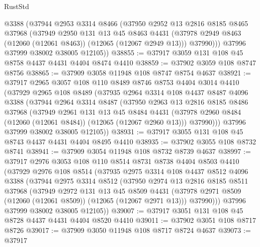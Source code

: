 \begin{lexlean}{RustStd}
\begin{coremodule}
        @3388
        (@37944
          @2953
          @3314
          @8466
          (@37950
            @2952
            @13
            @2816
            @8185
            @8465
            @37968
            (@37949
              @2950
              @131
              @13
              @45
              @8463
              @4431
              (@37978 @2949 @8463 (@12060 (@12061 @8463)) (@12065 (@12067 @2949 @13)))
              @37990)))
        @37996
        @37999
        @38002
        @38005
        @12105))
@38855 := @37917 @3059 @131 @108 @45 @8758 @4437 @4431 @4404 @8474 @4410
@38859 := @37902 @3059 @108 @8747 @8756
@38865 := @37909 @3058 @11948 @108 @8747 @8754 @4637
@38921 := @37917
    @2965
    @3057
    @108
    @110
    @8489
    @8746
    @8753
    @4404
    @3014
    @4410
    (@37929
      @2965
      @108
      @8489
      (@37935
        @2964
        @3314
        @108
        @4437
        @8487
        @4096
        @3388
        (@37944
          @2964
          @3314
          @8487
          (@37950
            @2963
            @13
            @2816
            @8185
            @8486
            @37968
            (@37949
              @2961
              @131
              @13
              @45
              @8484
              @4431
              (@37978 @2960 @8484 (@12060 (@12061 @8484)) (@12065 (@12067 @2960 @13)))
              @37990)))
        @37996
        @37999
        @38002
        @38005
        @12105))
@38931 := @37917 @3055 @131 @108 @45 @8743 @4437 @4431 @4404 @8495 @4410
@38935 := @37902 @3055 @108 @8732 @8741
@38941 := @37909 @3054 @11948 @108 @8732 @8739 @4637
@38997 := @37917
    @2976
    @3053
    @108
    @110
    @8514
    @8731
    @8738
    @4404
    @8503
    @4410
    (@37929
      @2976
      @108
      @8514
      (@37935
        @2975
        @3314
        @108
        @4437
        @8512
        @4096
        @3388
        (@37944
          @2975
          @3314
          @8512
          (@37950
            @2974
            @13
            @2816
            @8185
            @8511
            @37968
            (@37949
              @2972
              @131
              @13
              @45
              @8509
              @4431
              (@37978 @2971 @8509 (@12060 (@12061 @8509)) (@12065 (@12067 @2971 @13)))
              @37990)))
        @37996
        @37999
        @38002
        @38005
        @12105))
@39007 := @37917 @3051 @131 @108 @45 @8728 @4437 @4431 @4404 @8520 @4410
@39011 := @37902 @3051 @108 @8717 @8726
@39017 := @37909 @3050 @11948 @108 @8717 @8724 @4637
@39073 := @37917

\end{coremodule}
\end{lexlean}
